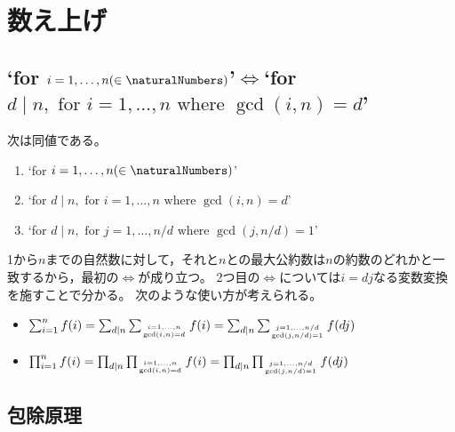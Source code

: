 \chapter{数え上げ}
    \section{\texorpdfstring{`for $i=1, \dotsc, n(\in \naturalNumbers)$'$\iff$`for $d \mid n, \text{ for } i=1,\dotsc,n \text{ where } \gcd(i,n)=d$'}{数え上げと最大公約数}}
        \begin{shadebox}
            次は同値である。
            \begin{enumerate}
                \item `for $i=1, \dotsc, n(\in \naturalNumbers)$'
                \item `for $d \mid n, \text{ for } i=1,\dotsc,n \text{ where } \gcd(i,n)=d$'
                \item `for $d \mid n, \text{ for } j=1,\dotsc,n/d \text{ where } \gcd(j,n/d)=1$'
            \end{enumerate}
        \end{shadebox}
        1から$n$までの自然数に対して，それと$n$との最大公約数は$n$の約数のどれかと一致するから，最初の$\iff$が成り立つ。
        2つ目の$\iff$については$i=dj$なる変数変換を施すことで分かる。
        次のような使い方が考えられる。
        \begin{itemize}
            \item $\sum_{i=1}^n f(i) = \sum_{d \mid n} \sum_{\genfrac{}{}{0pt}{}{i=1, \dotsc, n}{\gcd(i,n)=d}} f(i) = \sum_{d \mid n} \sum_{\genfrac{}{}{0pt}{}{j=1, \dotsc, n/d}{\gcd(j,n/d)=1}} f(dj)$
            \item $\prod_{i=1}^n f(i) = \prod_{d \mid n} \prod_{\genfrac{}{}{0pt}{}{i=1, \dotsc, n}{\gcd(i,n)=d}} f(i) = \prod_{d \mid n} \prod_{\genfrac{}{}{0pt}{}{j=1, \dotsc, n/d}{\gcd(j,n/d)=1}} f(dj)$
        \end{itemize}
    \section{包除原理}
